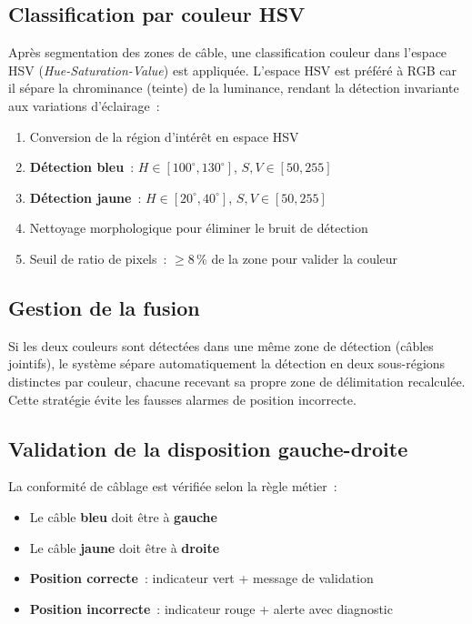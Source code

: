 \documentclass[12pt,a4paper]{report}
\begin{document}
\subsection{Classification par couleur HSV}

Apr\`es segmentation des zones de c\^able, une classification couleur dans l'espace HSV (\textit{Hue-Saturation-Value}) est appliqu\'ee. L'espace HSV est pr\'ef\'er\'e \`a RGB car il s\'epare la chrominance (teinte) de la luminance, rendant la d\'etection invariante aux variations d'\'eclairage~:
\begin{enumerate}
    \item Conversion de la r\'egion d'int\'er\^et en espace HSV
    \item \textbf{D\'etection bleu}~: $H \in [100^{\circ}, 130^{\circ}]$, $S, V \in [50, 255]$
    \item \textbf{D\'etection jaune}~: $H \in [20^{\circ}, 40^{\circ}]$, $S, V \in [50, 255]$
    \item Nettoyage morphologique pour \'eliminer le bruit de d\'etection
    \item Seuil de ratio de pixels~: $\geq 8\,\%$ de la zone pour valider la couleur
\end{enumerate}

\subsection{Gestion de la fusion}

Si les deux couleurs sont d\'etect\'ees dans une m\^eme zone de d\'etection (c\^ables jointifs), le syst\`eme s\'epare automatiquement la d\'etection en deux sous-r\'egions distinctes par couleur, chacune recevant sa propre zone de d\'elimitation recalcul\'ee. Cette strat\'egie \'evite les fausses alarmes de position incorrecte.

\subsection{Validation de la disposition gauche-droite}

La conformit\'e de c\^ablage est v\'erifi\'ee selon la r\`egle m\'etier~:
\begin{itemize}
    \item Le c\^able \textbf{bleu} doit \^etre \`a \textbf{gauche}
    \item Le c\^able \textbf{jaune} doit \^etre \`a \textbf{droite}
    \item \textbf{Position correcte}~: indicateur vert + message de validation
    \item \textbf{Position incorrecte}~: indicateur rouge + alerte avec diagnostic
\end{itemize}
\end{document}
